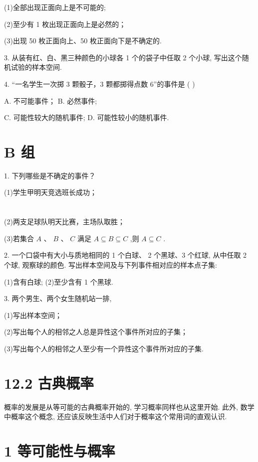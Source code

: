 \documentclass[10pt]{article}
\begin{document}
(1)全部出现正面向上是不可能的;

(2)至少有 1 枚出现正面向上是必然的；

(3)出现 50 枚正面向上、50 枚正面向下是不确定的.

3. 从装有红、白、黑三种颜色的小球各 1 个的袋子中任取 2 个小球, 写出这个随机试验的样本空间.

4. “一名学生一次掷 3 颗骰子，3 颗都掷得点数 6”的事件是 ( )

A. 不可能事件； B. 必然事件;

C. 可能性较大的随机事件; D. 可能性较小的随机事件.

\section*{B 组}

1. 下列哪些是不确定的事件？

(1)学生甲明天竞选班长成功；

\section*{}

(2)两支足球队明天比赛，主场队取胜；

(3)若集合 \(A\text{ 、 }B\text{ 、 }C\) 满足 \(A \subseteq  B \subseteq  C\) ,则 \(A \subseteq  C\) .

2. 一个口袋中有大小与质地相同的 1 个白球、 2 个黑球、3 个红球, 从中任取 2 个球, 观察球的颜色. 写出样本空间及与下列事件相对应的样本点子集:

(1)含有白球; (2)至少含有 1 个黑球.

3. 两个男生、两个女生随机站一排,

(1)写出样本空间；

(2)写出每个人的相邻之人总是异性这个事件所对应的子集；

(3)写出每个人的相邻之人至少有一个异性这个事件所对应的子集.



\section*{12.2 古典概率}

概率的发展是从等可能的古典概率开始的, 学习概率同样也从这里开始. 此外, 数学中概率这个概念, 还应该反映生活中人们对于概率这个常用词的直观认识.

\section*{1 等可能性与概率}
\end{document}
